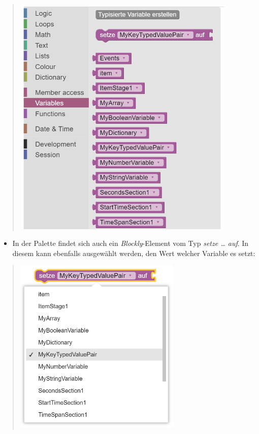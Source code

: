 \documentclass[
  letterpaper,
  DIV=11]{scrreprt}
\providecommand{\tightlist}{%
  \setlength{\itemsep}{0pt}\setlength{\parskip}{0pt}}\usepackage{longtable,booktabs,array}
\begin{document}
\begin{tcolorbox}
\begin{quote}
\includegraphics[width=4.16667in,height=\textheight]{img/screenshot-blockly-palette-list-of-variables-01-DEU.png}
\end{quote}

\begin{itemize}
\tightlist
\item
  In der Palette findet sich auch ein \emph{Blockly}-Element vom Typ
  \emph{setze \ldots{} auf}. In diesem kann ebenfalls ausgewählt werden,
  den Wert welcher Variable es setzt:
\end{itemize}

\begin{quote}
\includegraphics[width=3.125in,height=\textheight]{img/screenshot-blockly-set-list-of-variables-01-DEU.png}
\end{quote}


\end{tcolorbox}
\end{document}

